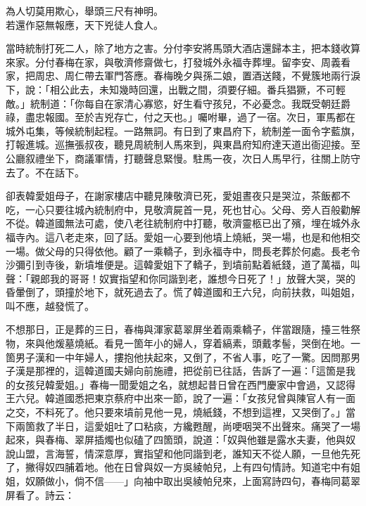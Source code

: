 \begin{myquote}
為人切莫用欺心，舉頭三尺有神明。\\若還作惡無報應，天下兇徒人食人。
\end{myquote}

當時統制打死二人，除了地方之害。分付李安將馬頭大酒店還歸本主，把本錢收算來家。分付春梅在家，與敬濟修齋做七，打發城外永福寺葬埋。{}留李安、周義看家，把周忠、周仁帶去軍門答應。春梅晚夕與孫二娘，置酒送餞，不覺簇地兩行淚下，說：「相公此去，未知幾時回還，出戰之間，須要仔細。番兵猖獗，不可輕敵。」統制道：「你每自在家清心寡慾，好生看守孩兒，不必憂念。我既受朝廷爵祿，盡忠報國。至於吉兇存亡，付之天也。」{}囑咐畢，過了一宿。次日，軍馬都在城外屯集，等候統制起程。一路無詞。有日到了東昌府下，統制差一面令字藍旗，打報進城。巡撫張叔夜，聽見周統制人馬來到，與東昌府知府達天道出衙迎接。至公廳叙禮坐下，商議軍情，打聽聲息緊慢。駐馬一夜，次日人馬早行，往關上防守去了。不在話下。

卻表韓愛姐母子，在謝家樓店中聽見陳敬濟已死，愛姐晝夜只是哭泣，茶飯都不吃，一心只要往城內統制府中，見敬濟屍首一見，死也甘心。{}父母、旁人百般勸解不從。韓道國無法可處，使八老往統制府中打聽，敬濟靈柩已出了殯，埋在城外永福寺內。這八老走來，回了話。愛姐一心要到他墳上燒紙，哭一場，也是和他相交一場。做父母的只得依他。顧了一乘轎子，到永福寺中，問長老葬於何處。長老令沙彌引到寺後，{}新墳堆便是。這韓愛姐下了轎子，到墳前點着紙錢，道了萬福，叫聲：「親郎我的哥哥！奴實指望和你同諧到老，誰想今日死了！」放聲大哭，哭的昏暈倒了，頭撞於地下，就死過去了。{}慌了韓道國和王六兒，向前扶救，叫姐姐，叫不應，越發慌了。

不想那日，正是葬的三日，春梅與渾家葛翠屏坐着兩乘轎子，伴當跟隨，擡三牲祭物，來與他煖墓燒紙。看見一箇年小的婦人，穿着縞素，頭戴孝髻，哭倒在地。一箇男子漢和一中年婦人，摟抱他扶起來，又倒了，不省人事，吃了一驚。因問那男子漢是那裡的，這韓道國夫婦向前施禮，把從前已往話，告訴了一遍：「這箇是我的女孩兒韓愛姐。」春梅一聞愛姐之名，就想起昔日曾在西門慶家中會過，又認得王六兒。韓道國悉把東京蔡府中出來一節，說了一遍：「女孩兒曾與陳官人有一面之交，不料死了。他只要來墳前見他一見，燒紙錢，不想到這裡，又哭倒了。」當下兩箇救了半日，這愛姐吐了口粘痰，方纔甦醒，尚哽咽哭不出聲來。痛哭了一場起來，與春梅、翠屏插燭也似磕了四箇頭，{}說道：「奴與他雖是露水夫妻，他與奴說山盟，言海誓，情深意厚，實指望和他同諧到老，誰知天不從人願，一旦他先死了，撇得奴四脯着地。他在日曾與奴一方吳綾帕兒，上有四句情詩。知道宅中有姐姐，奴願做小，倘不信——」向袖中取出吳綾帕兒來，上面寫詩四句，春梅同葛翠屏看了。詩云：

